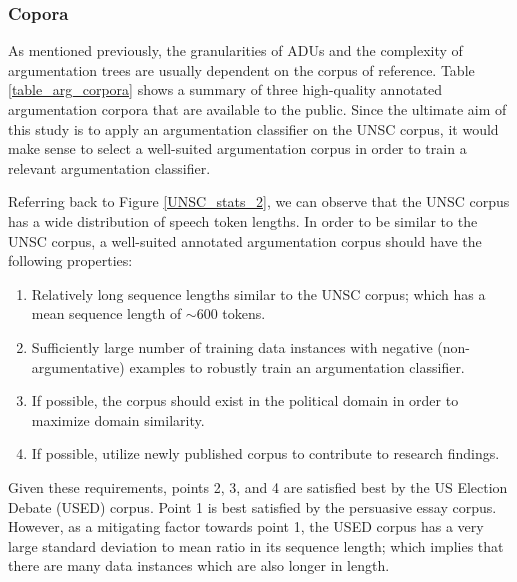 \subsubsection{Copora}
\label{corpora}

As mentioned previously, the granularities of ADUs and the complexity of argumentation trees are usually dependent on the corpus of reference. Table \ref{table_arg_corpora} shows a summary of three high-quality annotated argumentation corpora that are available to the public. Since the ultimate aim of this study is to apply an argumentation classifier on the UNSC corpus, it would make sense to select a well-suited argumentation corpus in order to train a relevant argumentation classifier.

Referring back to Figure \ref{UNSC_stats_2}, we can observe that the UNSC corpus has a wide distribution of speech token lengths. In order to be similar to the UNSC corpus, a well-suited annotated argumentation corpus should have the following properties:

\begin{enumerate}
    \item Relatively long sequence lengths similar to the UNSC corpus; which has a mean sequence length of $\sim$600 tokens.
    \item Sufficiently large number of training data instances with negative (non-argumentative) examples to robustly train an argumentation classifier.
    \item If possible, the corpus should exist in the political domain in order to maximize domain similarity.
    \item If possible, utilize newly published corpus to contribute to research findings.
\end{enumerate}

Given these requirements, points 2, 3, and 4 are satisfied best by the US Election Debate (USED) corpus. Point 1 is best satisfied by the persuasive essay corpus. However, as a mitigating factor towards point 1, the USED corpus has a very large standard deviation to mean ratio in its sequence length; which implies that there are many data instances which are also longer in length.

